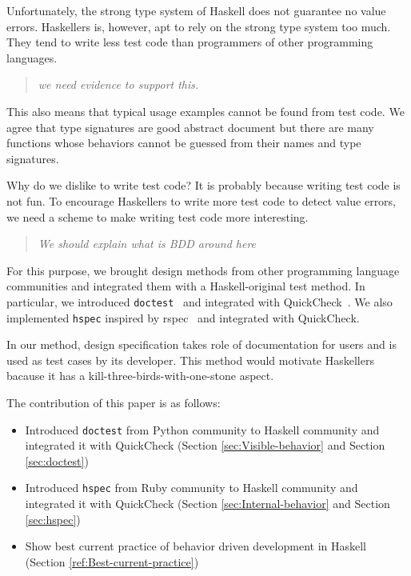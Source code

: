 \documentclass[preprint]{sigplanconf}
\begin{document}
Unfortunately, the strong type system of Haskell does not guarantee
no value errors.
Haskellers is, however, apt to rely on the strong type system too much.
They tend to write less test code than programmers of other
programming languages. 

\begin{quote}
    \emph{we need evidence to support this.}
\end{quote}

This also means that typical usage examples cannot be found from test code.
We agree that type signatures are good abstract document but
there are many functions whose behaviors cannot be guessed from
their names and type signatures.

Why do we dislike to write test code?
It is probably because writing test code is not fun.
To encourage Haskellers to write more test code
to detect value errors,
we need a scheme to make writing test code more interesting.

\begin{quote}
    \emph{We should explain what is BDD around here}
\end{quote}

For this purpose,
we brought design methods from other programming language communities and
integrated them with a Haskell-original test method.
In particular, we introduced {\tt doctest}~\cite{doctest} and
integrated with QuickCheck~\cite{quickcheck}. 
We also implemented {\tt hspec} inspired by rspec~\cite{rspec} 
and integrated with QuickCheck.

In our method, design specification takes role of documentation for users and
is used as test cases by its developer. 
This method would motivate Haskellers
bacause it has a kill-three-birds-with-one-stone aspect.



The contribution of this paper is as follows:

\begin{itemize}
\item Introduced {\tt doctest} from Python community to Haskell community
and integrated it with QuickCheck
(Section \ref{sec:Visible-behavior} and Section \ref{sec:doctest})
\item Introduced {\tt hspec} from Ruby community to Haskell community and
integrated it with QuickCheck
(Section \ref{sec:Internal-behavior} and Section \ref{sec:hspec})
\item Show best current practice of behavior driven development in Haskell (Section \ref{ref:Best-current-practice})
\end{itemize}
\end{document}
